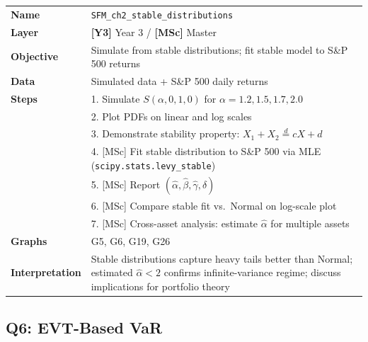 \documentclass[11pt, a4paper]{article}
\newcommand{\layerY}[1]{\textcolor{MainBlue}{\textbf{[Y3]}} #1}
\newcommand{\layerM}[1]{\textcolor{Forest}{\textbf{[MSc]}} #1}
\theoremstyle{definition}
\begin{document}
\begin{tabular}{l p{12cm}}
\toprule
\textbf{Name} & \texttt{SFM\_ch2\_stable\_distributions} \\
\textbf{Layer} & \layerY{Year 3} / \layerM{Master} \\
\textbf{Objective} & Simulate from stable distributions; fit stable model to S\&P 500 returns \\
\textbf{Data} & Simulated data + S\&P 500 daily returns \\
\textbf{Steps} &
  1. Simulate $S(\alpha, 0, 1, 0)$ for $\alpha = 1.2, 1.5, 1.7, 2.0$ \\
  & 2. Plot PDFs on linear and log scales \\
  & 3. Demonstrate stability property: $X_1 + X_2 \stackrel{d}{=} cX + d$ \\
  & 4. [MSc] Fit stable distribution to S\&P 500 via MLE (\texttt{scipy.stats.levy\_stable}) \\
  & 5. [MSc] Report $(\hat{\alpha}, \hat{\beta}, \hat{\gamma}, \hat{\delta})$ \\
  & 6. [MSc] Compare stable fit vs.\ Normal on log-scale plot \\
  & 7. [MSc] Cross-asset analysis: estimate $\hat{\alpha}$ for multiple assets \\
\textbf{Graphs} & G5, G6, G19, G26 \\
\textbf{Interpretation} & Stable distributions capture heavy tails better than Normal; estimated $\hat{\alpha} < 2$ confirms infinite-variance regime; discuss implications for portfolio theory \\
\bottomrule
\end{tabular}

\subsection{Q6: EVT-Based VaR}
\end{document}
